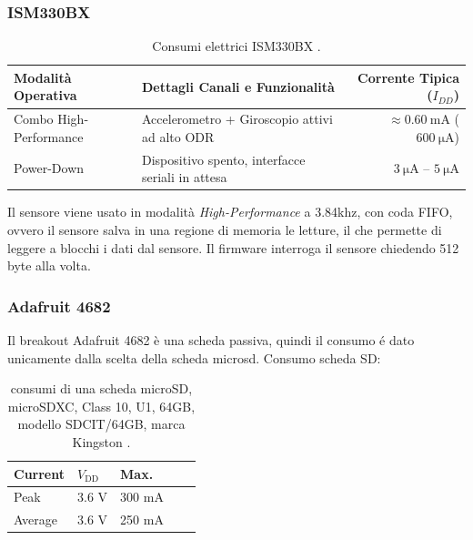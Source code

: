 \begin{samepage}
\subsubsection{ISM330BX}

\begin{table}[H]
	\centering
	\small
	\begin{tabularx}{\textwidth}{l X r}
		\toprule
		\textbf{Modalità Operativa} & \textbf{Dettagli Canali e Funzionalità} & \textbf{Corrente Tipica ($I_{DD}$)} \\
		\midrule
		Combo High-Performance & Accelerometro + Giroscopio attivi ad alto ODR & $\approx \SI{0.60}{\milli\ampere}$ ($\SI{600}{\micro\ampere}$) \\
		Power-Down & Dispositivo spento, interfacce seriali in attesa & $\SI{3}{\micro\ampere}$ -- $\SI{5}{\micro\ampere}$ \\
		\bottomrule
	\end{tabularx}
	\caption{Consumi elettrici ISM330BX \cite{ism330bx_datasheet}.}
	\label{tab:ism330bx_power}
\end{table}
Il sensore viene usato in modalità \textit{High-Performance} a 3.84khz, con coda FIFO, ovvero il sensore salva in una regione di memoria le letture, il che permette di leggere a blocchi i dati dal sensore. Il firmware interroga il sensore chiedendo 512 byte alla volta.
\end{samepage}
\begin{samepage}

 \subsubsection{Adafruit 4682}
 Il breakout Adafruit 4682 è una scheda passiva, quindi il consumo é dato unicamente dalla scelta della scheda microsd.
Consumo scheda SD:
\begin{table}[H]
	\centering

	\label{tab:microsd-current}
	\begin{tabular}{lllcc}
		\hline
		Current &  $V_{\mathrm{DD}}$ & Max. \\
		\hline
		Peak
		& 3.6 V
		& 300 mA \\
		\hline
		Average
		& 3.6 V
		& 250 mA \\
		\hline
	\end{tabular}
		\caption{consumi di una scheda microSD, microSDXC, Class 10, U1, 64GB, modello SDCIT/64GB, marca Kingston \cite{kingston_industrial_microsd}.}
\end{table}

\end{samepage}


